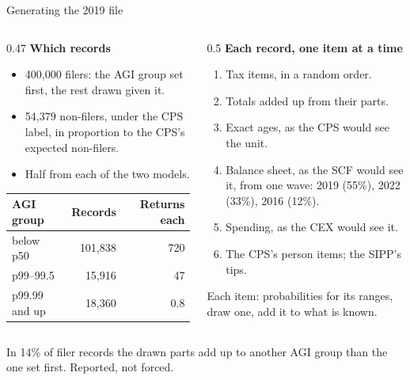 \documentclass[11pt,aspectratio=169]{beamer}
\newcommand{\slidenote}[1]{\par\vfill{\scriptsize\color{yalegrey}#1}}
\begin{document}
\begin{frame}{Generating the 2019 file}
  \small
  \begin{columns}[T]
    \begin{column}{0.47\textwidth}
      \textbf{\color{yaleblue}Which records}
      \begin{itemize}
        \item 400,000 filers: the AGI group set first, the rest drawn given it.
        \item 54,379 non-filers, under the CPS label, in proportion to the CPS's
              expected non-filers.
        \item Half from each of the two models.
      \end{itemize}
      \vspace{0.4em}
      \centering
      \begin{tabular}{lrr}
        \toprule
        AGI group & Records & Returns each \\
        \midrule
        below p50     & 101,838 & 720 \\
        p99--99.5     & 15,916  & 47 \\
        p99.99 and up & 18,360  & 0.8 \\
        \bottomrule
      \end{tabular}
    \end{column}
    \begin{column}{0.5\textwidth}
      \textbf{\color{yaleblue}Each record, one item at a time}
      \begin{enumerate}
        \item Tax items, in a random order.
        \item Totals added up from their parts.
        \item Exact ages, as the CPS would see the unit.
        \item Balance sheet, as the SCF would see it, from one wave: 2019 (55\%), 2022 (33\%), 2016 (12\%).
        \item Spending, as the CEX would see it.
        \item The CPS's person items; the SIPP's tips.
      \end{enumerate}
      \vspace{0.2em}
      Each item: probabilities for its ranges, draw one, add it to what is known.
    \end{column}
  \end{columns}
  \slidenote{In 14\% of filer records the drawn parts add up to another AGI group than the one set first. Reported, not forced.}
\end{frame}
\end{document}

